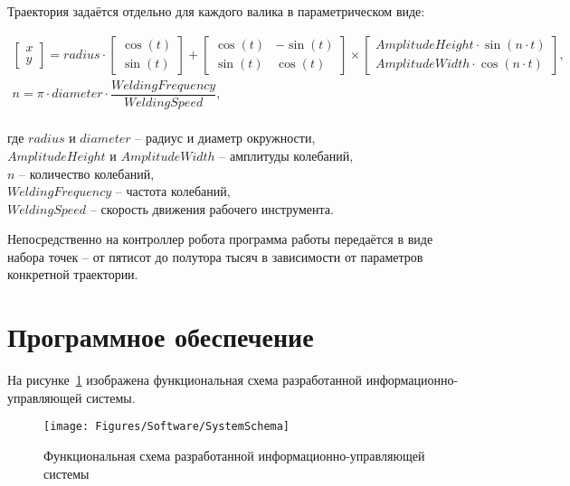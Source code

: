 Траектория задаётся отдельно для каждого валика в параметрическом виде:

\begin{gather*}
    \begin{bmatrix}
        x \\
        y
    \end{bmatrix} = radius \cdot
    \begin{bmatrix}
        \cos(t) \\
        \sin(t)
    \end{bmatrix}
    +
    \begin{bmatrix}
        \cos(t) & -\sin(t) \\
        \sin(t) & \cos(t)
    \end{bmatrix}
    \times
    \begin{bmatrix}
        AmplitudeHeight \cdot \sin(n \cdot t) \\
        AmplitudeWidth \cdot \cos(n \cdot t)
    \end{bmatrix}, \\
    n = \pi \cdot diameter \cdot \dfrac{WeldingFrequency}{WeldingSpeed},
\end{gather*} \\
где $radius$  и $diameter$ -- радиус и диаметр окружности, \\
$AmplitudeHeight$ и $AmplitudeWidth$ -- амплитуды колебаний, \\
$n$ -- количество колебаний, \\
$WeldingFrequency$ -- частота колебаний, \\
$WeldingSpeed$ -- скорость движения рабочего инструмента.

Непосредственно на контроллер робота программа работы передаётся в виде набора точек -- от пятисот до полутора тысяч в зависимости от параметров конкретной траектории.


\section{Программное обеспечение}
На рисунке~\ref{fig:System Schema} изображена функциональная схема разработанной информационно-управляющей системы.

\begin{figure}[H]
    \centering
    \vspace{14pt}
    \texttt{[image: Figures/Software/SystemSchema]}
    \caption{Функциональная схема разработанной информационно-управляющей системы}
    \label{fig:System Schema}
\end{figure}

